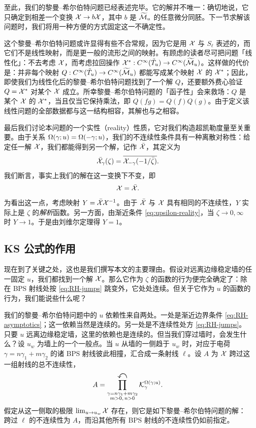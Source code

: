 至此，我们的黎曼--希尔伯特问题已经表述完毕。它的解并不唯一：确切地说，它只确定到相差一个变换 $\mathcal{X}\to b\mathcal{X}$，其中 $b$ 是 $\widetilde{\mathcal{M}}_u$ 的任意微分同胚。下一节求解该问题时，我们将用一种方便的方式固定这一不确定性。

这个黎曼--希尔伯特问题或许显得有些不合常规，因为它是用 $\mathcal{X}$ 与 $S_\ell$ 表述的，而它们不是线性映射，而是更一般的流形之间的映射。有顾虑的读者尽可把问题「线性化」：不去考虑 $\mathcal{X}$，而考虑拉回操作 $\mathcal{X}^*: C^\infty(\tilde T_u)\to C^\infty(\widetilde{\mathcal{M}}_u)$。这样做的代价是：并非每个映射 $Q: C^\infty(\tilde T_u)\to C^\infty(\widetilde{\mathcal{M}}_u)$ 都能写成某个映射 $\mathcal{X}$ 的 $\mathcal{X}^*$；因此，即使我们为线性化后的黎曼--希尔伯特问题找到了一个解 $Q$，还要额外费心验证 $Q=\mathcal{X}^*$ 对某个 $\mathcal{X}$ 成立。所幸黎曼--希尔伯特问题的「函子性」会来救场：$Q$ 是某个 $\mathcal{X}$ 的 $\mathcal{X}^*$，当且仅当它保持乘法，即 $Q(fg)=Q(f)Q(g)$。由于定义该线性问题的全部数据都与这一结构相容，其解也与之相容。

最后我们讨论本问题的一个实性（reality）性质，它对我们构造超凯勒度量至关重要。由于关系 $\Omega(\gamma;u)=\Omega(-\gamma;u)$，我们的不连续性条件具有一种离散对称性：给定任一解 $\mathcal{X}$，我们都能得到另一个解，记作 $\bar{\mathcal{X}}$，其定义为
\begin{equation}
\bar{\mathcal{X}}_\gamma(\zeta) = \overline{\mathcal{X}_{-\gamma}(-1/\bar\zeta)}.
\end{equation}
我们断言，事实上我们的解在这一变换下不变，即
\begin{equation} \label{eq:reality-X}
\mathcal{X} = \bar {\mathcal{X}}.
\end{equation}
为看出这一点，考虑映射 $Y=\bar{\mathcal{X}}\mathcal{X}^{-1}$。由于 $\bar{\mathcal{X}}$ 与 $\mathcal{X}$ 具有相同的不连续性，$Y$ 实际上是 $\zeta$ 的\emph{解析}函数。另一方面，由渐近条件 \eqref{eq:upsilon-reality}，当 $\zeta\to0,\infty$ 时 $Y\to1$。于是由刘维尔定理得 $Y=1$。

\subsection{KS 公式的作用} \label{sec:continuity-rh}

现在到了关键之处，这也是我们撰写本文的主要理由。假设对远离边缘稳定墙的任一固定 $u$，我们都找到一个解 $\mathcal{X}$。那么它作为 $\zeta$ 的函数的行为便完全确定了：除在 BPS 射线处按 \eqref{eq:RH-jumps} 跳变外，它处处连续。但关于它作为 $u$ 的函数的行为，我们能说些什么呢？

我们的黎曼--希尔伯特问题中的 $u$ 依赖性来自两处。一处是渐近边界条件 \eqref{eq:RH-asymptotics}；这一依赖当然是连续的。另一处是不连续性处方 \eqref{eq:RH-jumps}。只要 $u$ 远离边缘稳定墙，这里的依赖也是连续的。但当我们穿过墙时，会发生什么？设 $u_w$ 为墙上的一个一般点。当 $u$ 从墙的一侧趋于 $u_w$ 时，对应于电荷 $\gamma=n\gamma_1+m\gamma_2$ 的诸 BPS 射线彼此相撞，汇合成一条射线 $\ell$。设 $A$ 为 $\mathcal{X}$ 跨过这一组射线的总不连续性，
\begin{equation} \label{eq:disc-product}
A = \prod^{\text{\Large$\curvearrowleft$}}_{\substack{\gamma = n \gamma_1 + m \gamma_2 \\ m>0,\,n>0}}
\mathcal{K}_\gamma^{\Omega(\gamma;u)}.
\end{equation}
假定从这一侧取的极限 $\lim_{u\to u_w}\mathcal{X}$ 存在，则它是如下黎曼--希尔伯特问题的解：跨过 $\ell$ 的不连续性为 $A$，而沿其他所有 BPS 射线的不连续性仍如前指定。

